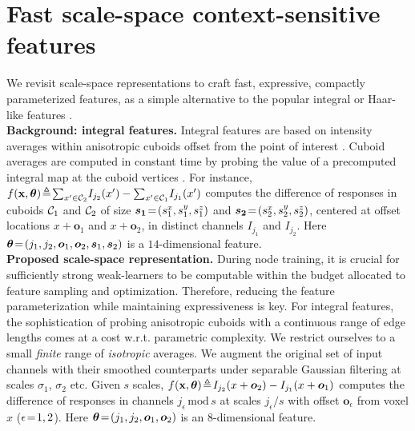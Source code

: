 \section{Fast scale-space context-sensitive features}
\label{sec: features}

We revisit scale-space representations to craft fast, expressive, compactly parameterized features, as a simple alternative to the popular integral or Haar-like features \cite{viola2001rapid}.\\

\noindent
\textbf{Background: integral features.} Integral features are based on intensity averages within anisotropic cuboids offset from the point of interest \cite{criminisi2013regression}. Cuboid averages are computed in constant time by probing the value of a precomputed integral map at the cuboid vertices \cite{viola2001rapid}. For instance, $f(\boldsymbol{\mathrm{x}}, \bm{\theta})\!\triangleq\!\sum_{x'\in\mathcal{C}_2}\!I_{j_2}(x') - \sum_{x'\in\mathcal{C}_1}\!I_{j_1}(x')$ computes the difference of responses in cuboids $\mathcal{C}_1$ and $\mathcal{C}_2$ of size $\bm{s_1}\!=\!(s_1^x,s_1^y,s_1^z)$ and $\bm{s_2}\!=\!(s_2^x,s_2^y,s_2^z)$, centered at offset locations $x+\bm{o}_1$ and $x+\bm{o}_2$, in distinct channels $I_{j_1}$ and $I_{j_2}$. Here $\bm{\theta}\!=\!(j_1,j_2,\bm{o}_1,\bm{o}_2,\bm{s}_1,\bm{s}_2)$ is a $14$-dimensional feature.\\

\noindent
\textbf{Proposed scale-space representation.} During node training, it is crucial for sufficiently strong 
weak-learners to be computable within the budget allocated to feature sampling and optimization. 
Therefore, reducing the feature parameterization while maintaining expressiveness is key. 
For integral features, the sophistication of probing anisotropic cuboids with a continuous range of edge lengths 
comes at a cost w.r.t. parametric complexity. We restrict ourselves to a small \textit{finite} range of \textit{isotropic} averages. We augment the original set of input channels with their smoothed counterparts under separable 
Gaussian filtering at scales $\sigma_1$, $\sigma_2$ etc. Given $s$ scales, $f(\boldsymbol{\mathrm{x}}, \bm{\theta})\!\triangleq\!I_{j_2}(x+\bm{o}_2) - I_{j_1}(x+\bm{o}_1)$ computes the difference of responses in channels $j_\epsilon\,\text{mod}\,s$ at scales $j_\epsilon / s$ with offset $\bm{o}_\epsilon$ from voxel $x$ ($\epsilon\!=\!1,2$). Here $\bm{\theta}\!=\!(j_1,j_2,\bm{o}_1,\bm{o}_2)$ is an $8$-dimensional feature. 

